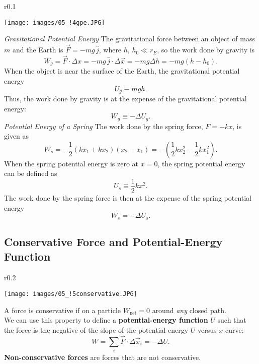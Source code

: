 \documentclass[11pt,a4paper]{report}
\begin{document}
\begin{wrapfigure}{r}{0.1\textwidth}
\vspace{-23pt}
\begin{center}
\texttt{[image: images/05\_!4gpe.JPG]}
\end{center}
\vspace{-20pt}
\end{wrapfigure}

\smallskip

\noindent
\textit{Gravitational Potential Energy} The gravitational force between an object of mass $m$ and the Earth is $\vec{F} = -mg\,\hat{j}$, where $h$, $h_0 \ll r_E$, so the work done by gravity is $$W_g = \vec{F} \cdot \Delta{x} = -mg\,\hat{j} \cdot \Delta{\vec{x}} = -mg \Delta{h} = -mg \left(h - h_0\right).$$
When the object is near the surface of the Earth, the gravitational potential energy $$U_g \equiv mgh.$$
Thus, the work done by gravity is at the expense of the gravitational potential energy: $$W_g \equiv -\Delta{U_g}.$$
\textit{Potential Energy of a Spring} The work done by the spring force, $F = -kx$, is given as $$W_s = -\frac{1}{2} \left(kx_1 + kx_2\right)\left(x_2 - x_1\right) = -\left(\frac{1}{2} kx_2^2 - \frac{1}{2} kx_1^2\right).$$
When the spring potential energy is zero at $x = 0$, the spring potential energy can be defined as $$U_s \equiv \frac{1}{2} kx^2.$$
The work done by the spring force is then at the expense of the spring potential energy $$W_s = -\Delta{U_s}.$$

\subsection{Conservative Force and Potential-Energy Function}

\begin{wrapfigure}{r}{0.2\textwidth}
\vspace{-20pt}
\begin{center}
\texttt{[image: images/05\_!5conservative.JPG]}
\end{center}
\vspace{-20pt}
\end{wrapfigure}

A force is conservative if on a particle $W_\mathrm{net} = 0$ around \textit{any} closed path.
\\We can use this property to define a \textbf{potential-energy function} $U$ such that the force is the negative of the slope of the potential-energy $U$-versus-$x$ curve: $$W = \sum_i \vec{F} \cdot \Delta{\vec{x}_i} = -\Delta{U}.$$
\textbf{Non-conservative forces} are forces that are not conservative.
\end{document}
